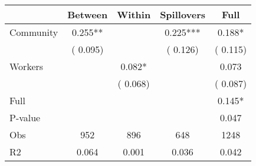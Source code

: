 
\begin{tabular}{l*{4}{c}}\hline&\multicolumn{1}{c}{Between}&\multicolumn{1}{c}{Within}&\multicolumn{1}{c}{Spillovers}&\multicolumn{1}{c}{Full}\\ \hline
 Community             &              0.255**      &                                               &        0.225*** &         0.188*                            \\ 
                               &        (       0.095)           &                                       &       (       0.126)     &      (       0.115)                                           \\ 
 Workers       &                                               &        0.082*    &                                &             0.073                            \\ 
                               &                                               & (       0.068)                  &                                        &      (       0.087)                                           \\ 
\hline                                                                                                                                                                                                                                            
 Full                  &                                               &                                               &                                        &             0.145*                                     \\ 
 P-value               &                                               &                                               &                                        &             0.047                                           \\ 
 Obs                   &               952               &       896                       &       648                &              1248                                               \\ 
 R2                    &                      0.064              &              0.001                      &              0.036               &                     0.042                                              \\ 
\hline \end{tabular}                                                                                                                                                                                                              